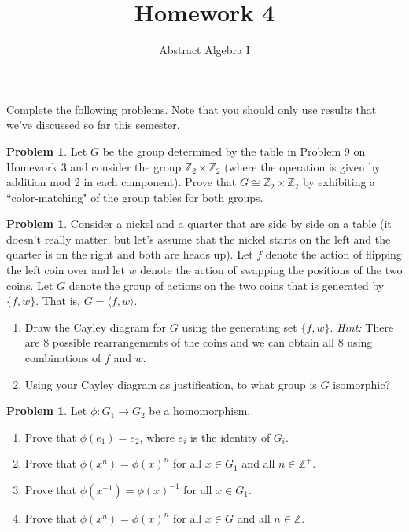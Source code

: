 \documentclass[11pt]{scrartcl}
\theoremstyle{definition}
\newtheorem{problem}[theorem]{Problem}
\begin{document}
\title{Homework 4}
\subtitle{Abstract Algebra I}
\date{}

\maketitle
\thispagestyle{fancy}

Complete the following problems. Note that you should only use results that we've discussed so far this semester. 

\begin{problem}
Let $G$ be the group determined by the table in Problem 9 on Homework 3 and consider the group $\mathbb{Z}_2\times \mathbb{Z}_2$ (where the operation is given by addition mod 2 in each component).  Prove that $G\cong \mathbb{Z}_2\times \mathbb{Z}_2$ by exhibiting a ``color-matching" of the group tables for both groups.
\end{problem}

\begin{problem}
Consider a nickel and a quarter that are side by side on a table (it doesn't really matter, but let's assume that the nickel starts on the left and the quarter is on the right and both are heads up).  Let $f$ denote the action of flipping the left coin over and let $w$ denote the action of swapping the positions of the two coins.  Let $G$ denote the group of actions on the two coins that is generated by $\{f,w\}$. That is, $G=\langle f,w\rangle$.
\begin{enumerate}[label=\rm{(\alph*)}]
\item Draw the Cayley diagram for $G$ using the generating set $\{f,w\}$. \emph{Hint:} There are 8 possible rearrangements of the coins and we can obtain all 8 using combinations of $f$ and $w$.
\item Using your Cayley diagram as justification, to what group is $G$ isomorphic?
\end{enumerate}
\end{problem}

\begin{problem}
Let $\phi:G_1\to G_2$ be a homomorphism.
\begin{enumerate}[label=\rm{(\alph*)}]
\item Prove that $\phi(e_1)=e_2$, where $e_i$ is the identity of $G_i$.
\item Prove that $\phi(x^n)=\phi(x)^n$ for all $x\in G_1$ and all $n\in\mathbb{Z}^+$.
\item Prove that $\phi(x^{-1})=\phi(x)^{-1}$ for all $x\in G_1$.
\item Prove that $\phi(x^n)=\phi(x)^n$ for all $x\in G$ and all $n\in\mathbb{Z}$.
\end{enumerate}
\end{problem}
\end{document}
